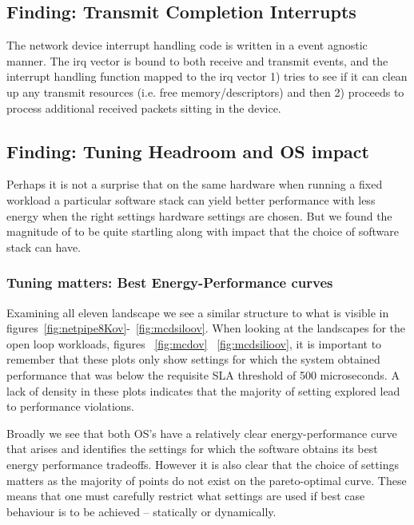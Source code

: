 \subsection{Finding: Transmit Completion Interrupts}
The network device interrupt handling code is written in a event agnostic manner. The irq vector is bound to both receive and transmit events, and the interrupt handling function mapped to the irq vector 1) tries to see if it can clean up any transmit resources (i.e. free memory/descriptors) and then 2) proceeds to process additional received packets sitting in the device. 


\subsection{Finding: Tuning Headroom and OS impact}

Perhaps it is not a surprise that on the same hardware when running a fixed
workload a particular software stack can yield better performance with less
energy when the right settings hardware settings are chosen.  But we found the
magnitude of to be quite startling along with impact that the choice of
software stack can have.  
 
\subsubsection{Tuning matters: Best Energy-Performance curves}

Examining all eleven landscape we see a similar structure to what is visible in figures~\ref{fig:netpipe8Kov}-~\ref{fig:mcdsiloov}.  When looking at the landscapes for the open loop workloads, figures ~\ref{fig:mcdov} ~\ref{fig:mcdsilioov}, it is important to remember that these plots only show settings for which the system obtained performance that was below the requisite SLA threshold of 500 microseconds.  A lack of density in these plots indicates that the majority of setting explored lead to performance violations.

Broadly we see that both OS's have a relatively clear energy-performance curve that arises and identifies the settings for which the software obtains its best energy performance tradeoffs.  However it is also clear that the choice of settings matters as the majority of points do not exist on the pareto-optimal curve.  These means that one must carefully restrict what settings are used if best case behaviour is to be achieved -- statically or dynamically.  

